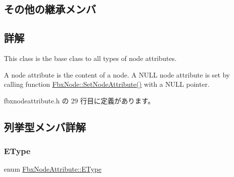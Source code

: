 \subsection*{その他の継承メンバ}


\subsection{詳解}
This class is the base class to all types of node attributes.

A node attribute is the content of a node. A {\ttfamily N\+U\+LL} node attribute is set by calling function \hyperlink{class_fbx_node_adb194a043dd1ccf3bc1e3bda520dc97a}{Fbx\+Node\+::\+Set\+Node\+Attribute()} with a {\ttfamily N\+U\+LL} pointer. 

 fbxnodeattribute.\+h の 29 行目に定義があります。



\subsection{列挙型メンバ詳解}
\mbox{\label{class_fbx_node_attribute_a08e1669d3d1a696910756ab17de56d6a}} 
\subsubsection{\texorpdfstring{E\+Type}{EType}}
{\footnotesize\ttfamily enum \hyperlink{class_fbx_node_attribute_a08e1669d3d1a696910756ab17de56d6a}{Fbx\+Node\+Attribute\+::\+E\+Type}}

